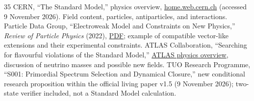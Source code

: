 \documentclass[11pt,a4paper]{article}
\theoremstyle{tmon}
\theoremstyle{definition}
\begin{document}
\begin{thebibliography}{35}
CERN, ``The Standard Model,'' physics overview, \href{https://home.web.cern.ch/science/physics/standard-model}{home.web.cern.ch} (accessed 9 November 2026). Field content, particles, antiparticles, and interactions.
Particle Data Group, ``Electroweak Model and Constraints on New Physics,'' \emph{Review of Particle Physics} (2022), \href{https://pdg.lbl.gov/2022/reviews/rpp2022-rev-standard-model.pdf}{PDF}; example of compatible vector-like extensions and their experimental constraints.
ATLAS Collaboration, ``Searching for flavourful violations of the Standard Model,'' \href{https://atlas.cern/Updates/Feature/LFV-FCNC}{ATLAS physics overview}, discussion of neutrino masses and possible new fields.
TUO Research Programme, ``S001: Primordial Spectrum Selection and Dynamical Closure,'' new conditional research proposition within the official living paper v1.5 (9 November 2026); two-state verifier included, not a Standard Model calculation.


\end{thebibliography}
\end{document}
